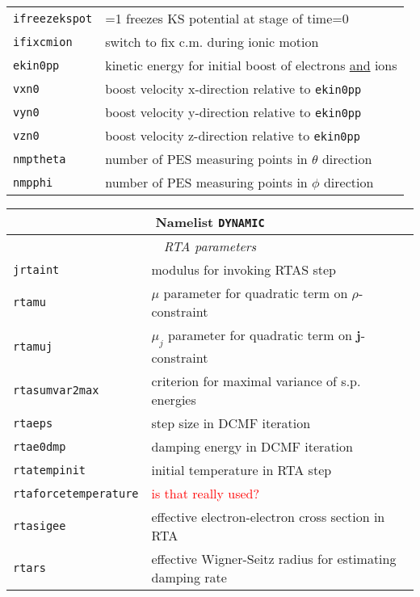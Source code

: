 \documentclass[12pt]{article}
\renewcommand{\vec}[1]{\mathbf #1}
\begin{document}
\begin{tabular}{ll}
{\tt ifreezekspot} &  =1 freezes KS potential at stage of time=0\\
{\tt ifixcmion} & switch to fix c.m. during ionic motion \\
{\tt ekin0pp} & kinetic energy for initial boost of electrons
\underline{and} ions \\
{\tt vxn0} & boost velocity x-direction relative to {\tt ekin0pp} \\
{\tt vyn0} & boost velocity y-direction relative to {\tt ekin0pp}  \\
{\tt vzn0} &  boost velocity z-direction relative to {\tt ekin0pp} \\
{\tt nmptheta} &  number of PES measuring points in $\theta$ direction  \\
{\tt nmpphi} &   number of PES measuring points in $\phi$ direction  \\
\hline
\end{tabular}

\begin{tabular}{ll}
\hline
\multicolumn{2}{c}{Namelist {\tt DYNAMIC}} in {\tt for005.<name>} \\
\hline
\multicolumn{2}{c}{\it RTA parameters} \\
\hline
{\tt jrtaint} & modulus for invoking RTAS step \\
{\tt rtamu} &  $\mu$ parameter for quadratic term on $\rho$-constraint\\
{\tt rtamuj} &  $\mu_j$ parameter for quadratic term on $\vec{j}$-constraint \\
{\tt rtasumvar2max} & criterion for maximal variance of s.p. energies \\
{\tt rtaeps} & step size in DCMF iteration\\
{\tt rtae0dmp} & damping energy in DCMF iteration \\
{\tt rtatempinit} & initial temperature in RTA step \\
{\tt rtaforcetemperature} & \textcolor{red}{is that really used?} \\
{\tt rtasigee} & effective electron-electron cross section in RTA \\
{\tt rtars} & effective Wigner-Seitz radius for estimating damping rate \\
\hline
\end{tabular}
\end{document}
